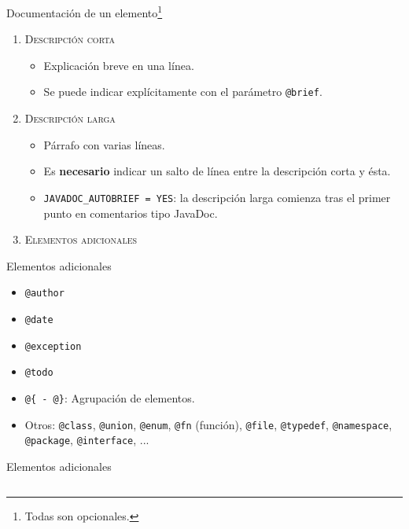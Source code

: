 \documentclass[12pt,xcolor=svgnames]{beamer}
\begin{document}
\begin{frame}{Documentación de un elemento\footnote{Todas son opcionales.}}
  \begin{enumerate}
  \item \textsc{Descripción corta}
    \begin{itemize}
    \item Explicación breve en una línea.
    \item Se puede indicar explícitamente con el parámetro \texttt{@brief}.
    \end{itemize}
  \item \textsc{Descripción larga}
    \begin{itemize}
    \item Párrafo con varias líneas.
    \item Es \textbf{necesario} indicar un salto de línea entre la descripción
      corta y ésta.
    \item \texttt{JAVADOC\_AUTOBRIEF = YES}: la descripción larga comienza tras
      el primer punto en comentarios tipo JavaDoc.
    \end{itemize}
  \item \textsc{Elementos adicionales}
  \end{enumerate}
\end{frame}

\begin{frame}{Elementos adicionales}
  \begin{itemize}
  \item \texttt{@author}
  \item \texttt{@date}
  \item \texttt{@exception}
  \item \texttt{@todo}
  \item \texttt{@\{ - @\}}: Agrupación de elementos.
  \item Otros: \texttt{@class}, \texttt{@union}, \texttt{@enum}, \texttt{@fn}
    (función), \texttt{@file}, \texttt{@typedef}, \texttt{@namespace},
    \texttt{@package}, \texttt{@interface}, ...
  \end{itemize}
\end{frame}

\begin{frame}[fragile]{Elementos adicionales}
  \inputminted[fontsize=\footnotesize,linenos=true]{c++}{../materiales/codigo/elem-adicionales.cpp}
\end{frame}
\end{document}
